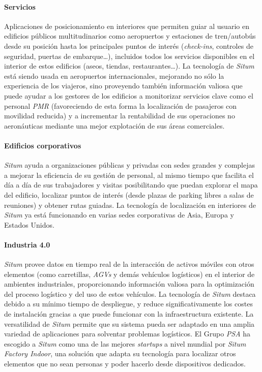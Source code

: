 \paragraph{Servicios}
Aplicaciones de posicionamiento en interiores que permiten guiar al usuario en edificios públicos multitudinarios como aeropuertos y estaciones de tren/autobús desde su posición hasta los principales puntos de interés (\textit{check-ins}, controles de seguridad, puertas de embarque…), incluidos todos los servicios disponibles en el interior de estos edificios (aseos, tiendas, restaurantes…).
La tecnología de \textit{Situm} está siendo usada en aeropuertos internacionales, mejorando no sólo la experiencia de los viajeros, sino proveyendo también información valiosa que puede ayudar a los gestores de los edificios a monitorizar servicios clave como el personal \textit{PMR} (favoreciendo de esta forma la localización de pasajeros con movilidad reducida) y a incrementar la rentabilidad de sus operaciones no aeronáuticas mediante una mejor explotación de sus áreas comerciales.

\paragraph{Edificios corporativos}
\textit{Situm} ayuda a organizaciones públicas y privadas con sedes grandes y complejas a mejorar la eficiencia de su gestión de personal, al mismo tiempo que facilita el día a día de sus trabajadores y visitas posibilitando que puedan explorar el mapa del edificio, localizar puntos de interés (desde plazas de parking libres a salas de reuniones) y obtener rutas guiadas.
La tecnología de localización en interiores de \textit{Situm} ya está funcionando en varias sedes corporativas de Asia, Europa y Estados Unidos.

\paragraph{Industria 4.0}
\textit{Situm} provee datos en tiempo real de la interacción de activos móviles con otros elementos (como carretillas, \textit{AGVs} y demás vehículos logísticos) en el interior de ambientes industriales, proporcionando información valiosa para la optimización del proceso logístico y del uso de estos vehículos. La tecnología de \textit{Situm} destaca debido a su mínimo tiempo de despliegue, y reduce significativamente los costes de instalación gracias a que puede funcionar con la infraestructura existente.
La versatilidad de \textit{Situm} permite que su sistema pueda ser adaptado en una amplia variedad de aplicaciones para solventar problemas logísticos.
El Grupo \textit{PSA} ha escogido a \textit{Situm} como una de las mejores \textit{startups} a nivel mundial por \textit{Situm Factory Indoor}, una solución que adapta su tecnología para localizar otros elementos que no sean personas y poder hacerlo desde dispositivos dedicados.

